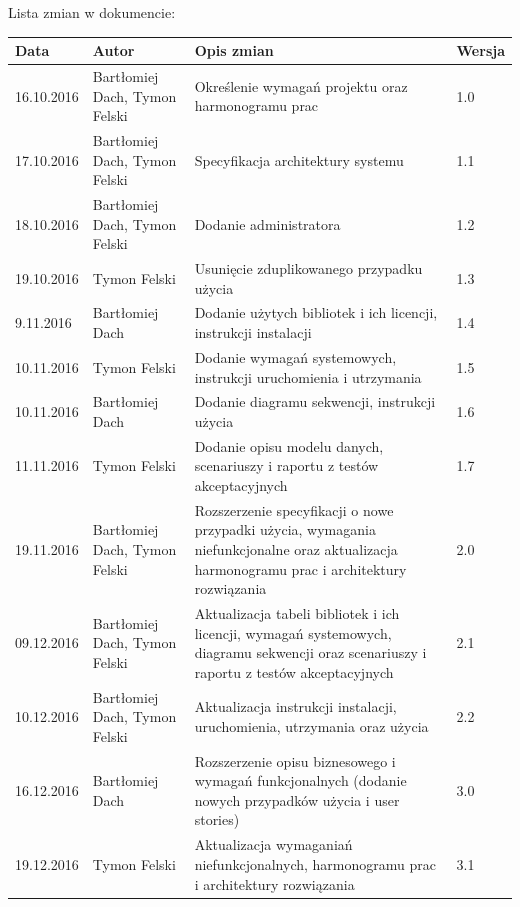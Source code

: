 \documentclass[10pt,a4paper]{article}
\begin{document}
\noindent
Lista zmian w dokumencie:
\begin{table}[H]
\def\arraystretch{1.5}
\begin{tabularx}{\textwidth}{|l|l|X|l|}
	\hline
	\textbf{Data} & \textbf{Autor} & \textbf{Opis zmian} & \textbf{Wersja} \\
	\hline
	16.10.2016 & Bartłomiej Dach, Tymon Felski & Określenie wymagań projektu oraz harmonogramu prac & 1.0 \\
	\hline
	17.10.2016 & Bartłomiej Dach, Tymon Felski & Specyfikacja architektury systemu & 1.1 \\
	\hline
	18.10.2016 & Bartłomiej Dach, Tymon Felski & Dodanie administratora & 1.2 \\
	\hline
	19.10.2016 & Tymon Felski & Usunięcie zduplikowanego przypadku użycia & 1.3 \\
	\hline
	9.11.2016 & Bartłomiej Dach & Dodanie użytych bibliotek i ich licencji, instrukcji instalacji & 1.4 \\
	\hline
	10.11.2016 & Tymon Felski & Dodanie wymagań systemowych, instrukcji uruchomienia i utrzymania & 1.5 \\
	\hline
	10.11.2016 & Bartłomiej Dach & Dodanie diagramu sekwencji, instrukcji użycia & 1.6 \\
	\hline
	11.11.2016 & Tymon Felski & Dodanie opisu modelu danych, scenariuszy i raportu z testów akceptacyjnych & 1.7 \\
	\hline
	19.11.2016 & Bartłomiej Dach, Tymon Felski & Rozszerzenie specyfikacji o nowe przypadki użycia, wymagania niefunkcjonalne oraz aktualizacja harmonogramu prac i architektury rozwiązania & 2.0 \\
	\hline
	09.12.2016 & Bartłomiej Dach, Tymon Felski & Aktualizacja tabeli bibliotek i ich licencji, wymagań systemowych, diagramu sekwencji oraz scenariuszy i raportu z testów akceptacyjnych & 2.1 \\
	\hline
	10.12.2016 & Bartłomiej Dach, Tymon Felski & Aktualizacja instrukcji instalacji, uruchomienia, utrzymania oraz użycia & 2.2 \\
	\hline
	16.12.2016 & Bartłomiej Dach & Rozszerzenie opisu biznesowego i wymagań funkcjonalnych (dodanie nowych przypadków użycia i user stories) & 3.0 \\
	\hline
	19.12.2016 & Tymon Felski & Aktualizacja wymaganiań niefunkcjonalnych, harmonogramu prac i architektury rozwiązania & 3.1 \\
	\hline
\end{tabularx}
\end{table}
\end{document}
